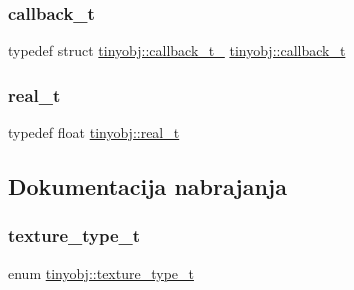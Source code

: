 \subsubsection{\texorpdfstring{callback\+\_\+t}{callback\_t}}
{\footnotesize\ttfamily typedef struct \hyperlink{structtinyobj_1_1callback__t__}{tinyobj\+::callback\+\_\+t\+\_\+}  \hyperlink{namespacetinyobj_a7d9ae2b4716367a1b66b4d354482b035}{tinyobj\+::callback\+\_\+t}}

\mbox{\label{namespacetinyobj_ad5ca7469ff56bf0d8423120cfd99adce}} 
\subsubsection{\texorpdfstring{real\+\_\+t}{real\_t}}
{\footnotesize\ttfamily typedef float \hyperlink{namespacetinyobj_ad5ca7469ff56bf0d8423120cfd99adce}{tinyobj\+::real\+\_\+t}}



\subsection{Dokumentacija nabrajanja}
\mbox{\label{namespacetinyobj_a5c9f207e1f880a48bac0a3b69f16d7f8}} 
\subsubsection{\texorpdfstring{texture\+\_\+type\+\_\+t}{texture\_type\_t}}
{\footnotesize\ttfamily enum \hyperlink{namespacetinyobj_a5c9f207e1f880a48bac0a3b69f16d7f8}{tinyobj\+::texture\+\_\+type\+\_\+t}}

